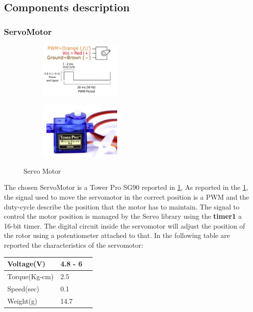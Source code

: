\subsection{Components description}
\subsubsection{ServoMotor}
	\begin{figure}[h]
		\centering
		\begin{subfigure}{0.4\textwidth} %
			\includegraphics[width=4cm,keepaspectratio]{img/servo_signal}
			\end{subfigure}
		\vspace{1em} %
		\begin{subfigure}{0.4\textwidth} %
			\includegraphics[width=4cm,keepaspectratio]{img/servomotor}
		\end{subfigure}
		\caption{Servo Motor}
		\label{fig:ServoMotor}
	\end{figure}

	The chosen ServoMotor is a Tower Pro SG90 reported in \ref{fig:ServoMotor},
	As reported in the \ref{fig:ServoMotor}, the signal used to move the servomotor in the correct position is a PWM and the duty-cycle describe the position that the motor has to maintain.
	The signal to control the motor position is managed by the Servo library using the \textbf{timer1} a 16-bit timer.
	The digital circuit inside the servomotor will adjust the position of the rotor using a potentiometer attached to that.
	In the following table are reported	the characteristics of the servomotor:
	\begin{center}
		\begin{tabular}{||l | l | l||} 
			\hline
			Voltage(V) & 4.8 - 6 \\ 
			\hline
			Torque(Kg-cm) & 2.5 \\
			\hline
			Speed(sec) & 0.1 \\
			\hline
			Weight(g) & 14.7 \\
			\hline
		\end{tabular}
	\end{center}

